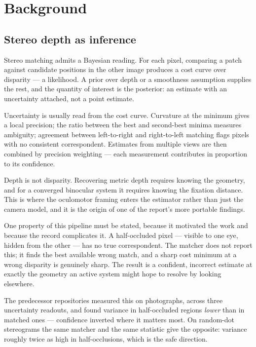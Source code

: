 \section{Background}

\subsection{Stereo depth as inference}

Stereo matching admits a Bayesian reading. For each pixel, comparing a patch
against candidate positions in the other image produces a cost curve over
disparity --- a likelihood. A prior over depth or a smoothness assumption
supplies the rest, and the quantity of interest is the posterior: an estimate
with an uncertainty attached, not a point estimate.

Uncertainty is usually read from the cost curve. Curvature at the minimum gives
a local precision; the ratio between the best and second-best minima measures
ambiguity; agreement between left-to-right and right-to-left matching flags
pixels with no consistent correspondent. Estimates from multiple views are then
combined by precision weighting --- each measurement contributes in proportion
to its confidence.

Depth is not disparity. Recovering metric depth requires knowing the geometry,
and for a converged binocular system it requires knowing the fixation distance.
This is where the oculomotor framing enters the estimator rather than just the
camera model, and it is the origin of one of the report's more portable
findings.

One property of this pipeline must be stated, because it motivated the work and
because the record complicates it. A half-occluded pixel --- visible to one eye,
hidden from the other --- has no true correspondent. The matcher does not report
this; it finds the best available wrong match, and a sharp cost minimum at a
wrong disparity is genuinely sharp. The result is a confident, incorrect
estimate at exactly the geometry an active system might hope to resolve by
looking elsewhere.

The predecessor repositories measured this on photographs, across three
uncertainty readouts, and found variance in half-occluded regions \emph{lower}
than in matched ones --- confidence inverted where it matters most. On
random-dot stereograms the same matcher and the same statistic give the
opposite: variance roughly twice as high in half-occlusions, which is the safe
direction.

